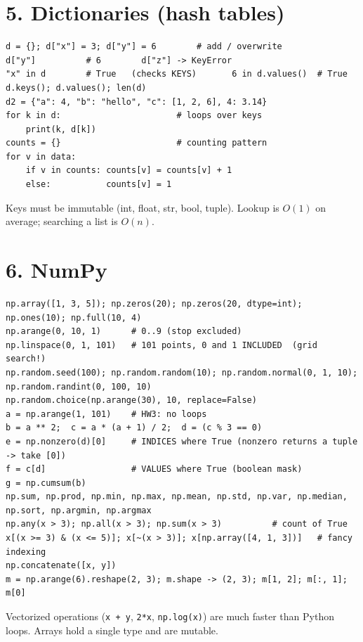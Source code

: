 \documentclass[10pt]{article}
\newcommand{\code}[1]{\lstinline[basicstyle=\ttfamily\small]{#1}}
\begin{document}
\section*{5. Dictionaries (hash tables)}
\begin{lstlisting}
d = {}; d["x"] = 3; d["y"] = 6        # add / overwrite
d["y"]          # 6        d["z"] -> KeyError
"x" in d        # True   (checks KEYS)       6 in d.values()  # True
d.keys(); d.values(); len(d)
d2 = {"a": 4, "b": "hello", "c": [1, 2, 6], 4: 3.14}
for k in d:                       # loops over keys
    print(k, d[k])
counts = {}                       # counting pattern
for v in data:
    if v in counts: counts[v] = counts[v] + 1
    else:           counts[v] = 1
\end{lstlisting}
Keys must be immutable (int, float, str, bool, tuple). Lookup is $O(1)$ on average; searching a list is $O(n)$.

\section*{6. NumPy}
\begin{lstlisting}
np.array([1, 3, 5]); np.zeros(20); np.zeros(20, dtype=int); np.ones(10); np.full(10, 4)
np.arange(0, 10, 1)      # 0..9 (stop excluded)
np.linspace(0, 1, 101)   # 101 points, 0 and 1 INCLUDED  (grid search!)
np.random.seed(100); np.random.random(10); np.random.normal(0, 1, 10); np.random.randint(0, 100, 10)
np.random.choice(np.arange(30), 10, replace=False)
a = np.arange(1, 101)    # HW3: no loops
b = a ** 2;  c = a * (a + 1) / 2;  d = (c % 3 == 0)
e = np.nonzero(d)[0]     # INDICES where True (nonzero returns a tuple -> take [0])
f = c[d]                 # VALUES where True (boolean mask)
g = np.cumsum(b)
np.sum, np.prod, np.min, np.max, np.mean, np.std, np.var, np.median, np.sort, np.argmin, np.argmax
np.any(x > 3); np.all(x > 3); np.sum(x > 3)          # count of True
x[(x >= 3) & (x <= 5)]; x[~(x > 3)]; x[np.array([4, 1, 3])]   # fancy indexing
np.concatenate([x, y])
m = np.arange(6).reshape(2, 3); m.shape -> (2, 3); m[1, 2]; m[:, 1]; m[0]
\end{lstlisting}
Vectorized operations (\code{x + y}, \code{2*x}, \code{np.log(x)}) are much faster than Python loops. Arrays hold a single type and are mutable.

\end{document}
